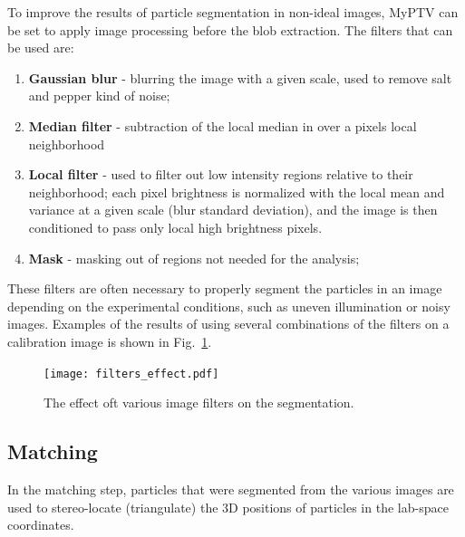 \documentclass[10pt,a4paper]{article}
\begin{document}
To improve the results of particle segmentation in non-ideal images, MyPTV can be set to apply image processing before the blob extraction. The filters that can be used are: 
\begin{enumerate}
	\item \textbf{Gaussian blur} - blurring the image with a given scale, used to remove salt and pepper kind of noise; 
	\item \textbf{Median filter} - subtraction of the local median in over a pixels local neighborhood 
	\item \textbf{Local filter} - used to filter out low intensity regions relative to their neighborhood; each pixel brightness is normalized with the local mean and variance at a given scale (blur standard deviation), and the image is then conditioned to pass only local high brightness pixels.
	\item \textbf{Mask} - masking out of regions not needed for the analysis;  
\end{enumerate}
These filters are often necessary to properly segment the particles in an image depending on the experimental conditions, such as uneven illumination or noisy images. Examples of the results of using several combinations of the filters on a calibration image is shown in Fig.~\ref{fig:image_filters}. 




\begin{figure}[h!]
	\centering
	\texttt{[image: filters\_effect.pdf]}
	\caption{The effect oft various image filters on the segmentation.\label{fig:image_filters}}
\end{figure}



















\subsection{Matching}\label{sec:workflow_match}

In the matching step, particles that were segmented from the various images are used to stereo-locate (triangulate) the 3D positions of particles in the lab-space coordinates. 
\end{document}
